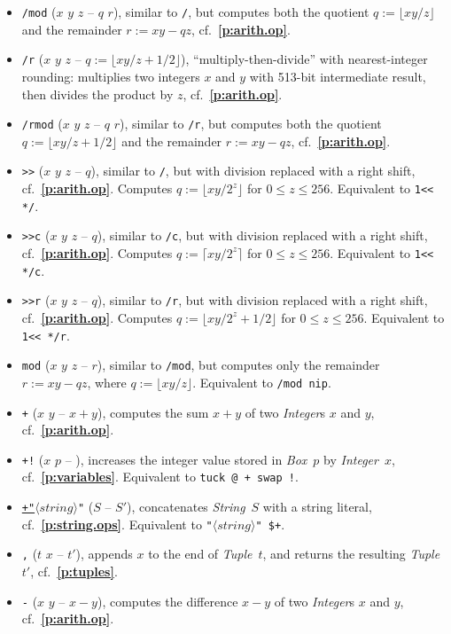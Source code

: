 \documentclass[12pt,oneside]{article}
\def\refpoint#1{{\rm\textbf{\ref{#1}}}}
\let\ptref=\refpoint
\begin{document}
\begin{itemize}
\item {\tt */mod} ($x$ $y$ $z$ -- $q$ $r$), similar to {\tt */}, but computes both the quotient $q:=\lfloor xy/z\rfloor$ and the remainder $r:=xy-qz$, cf.~\ptref{p:arith.op}.
\item {\tt */r} ($x$ $y$ $z$ -- $q:=\lfloor xy/z+1/2\rfloor$), ``multiply-then-divide'' with nearest-integer rounding: multiplies two integers $x$ and $y$ with 513-bit intermediate result, then divides the product by $z$, cf.~\ptref{p:arith.op}.
\item {\tt */rmod} ($x$ $y$ $z$ -- $q$ $r$), similar to {\tt */r}, but computes both the quotient $q:=\lfloor xy/z+1/2\rfloor$ and the remainder $r:=xy-qz$, cf.~\ptref{p:arith.op}.
\item {\tt *>{}>} ($x$ $y$ $z$ -- $q$), similar to {\tt */}, but with division replaced with a right shift, cf.~\ptref{p:arith.op}. Computes $q:=\lfloor xy/2^z\rfloor$ for $0\leq z\leq 256$. Equivalent to {\tt 1<{}< */}.
\item {\tt *>{}>c} ($x$ $y$ $z$ -- $q$), similar to {\tt */c}, but with division replaced with a right shift, cf.~\ptref{p:arith.op}. Computes $q:=\lceil xy/2^z\rceil$ for $0\leq z\leq 256$. Equivalent to {\tt 1<{}< */c}.
\item {\tt *>{}>r} ($x$ $y$ $z$ -- $q$), similar to {\tt */r}, but with division replaced with a right shift, cf.~\ptref{p:arith.op}. Computes $q:=\lfloor xy/2^z+1/2\rfloor$ for $0\leq z\leq 256$. Equivalent to {\tt 1<{}< */r}.
\item {\tt *mod} ($x$ $y$ $z$ -- $r$), similar to {\tt */mod}, but computes only the remainder $r:=xy-qz$, where $q:=\lfloor xy/z\rfloor$. Equivalent to {\tt */mod nip}.
\item {\tt +} ($x$ $y$ -- $x+y$), computes the sum $x+y$ of two {\em Integer\/}s $x$ and $y$, cf.~\ptref{p:arith.op}.
\item {\tt +!} ($x$ $p$ -- ), increases the integer value stored in {\em Box\/}~$p$ by {\em Integer\/}~$x$, cf.~\ptref{p:variables}. Equivalent to {\tt tuck @ + swap !}.
\item {\tt\underline{+"}$\langle\textit{string}\rangle$"} ($S$ -- $S'$), concatenates {\em String\/}~$S$ with a string literal, cf.~\ptref{p:string.ops}. Equivalent to {\tt "$\langle\textit{string}\rangle$" \$+}.
\item {\tt ,} ($t$ $x$ -- $t'$), appends $x$ to the end of {\em Tuple\/}~$t$, and returns the resulting {\em Tuple\/}~$t'$, cf.~\ptref{p:tuples}.
\item {\tt -} ($x$ $y$ -- $x-y$), computes the difference $x-y$ of two {\em Integer\/}s $x$ and $y$, cf.~\ptref{p:arith.op}.

\end{itemize}
\end{document}

